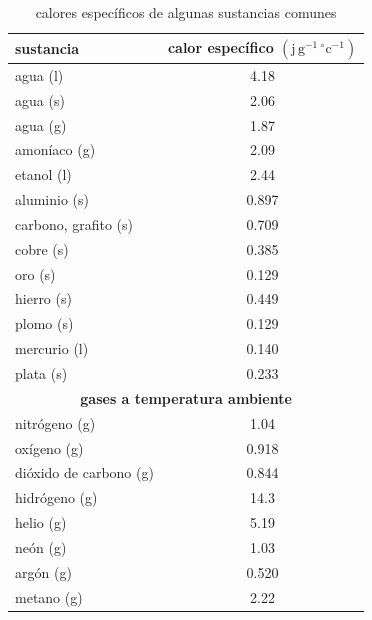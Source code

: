 \begin{table}[h!]
      \centering
      \caption{calores específicos de algunas sustancias comunes}
      \label{tab:calores_especificos}
      \begin{tabular}{l c}
          \hline
          \textbf{sustancia} & \textbf{calor específico} $\left(\mathrm{j\,g^{-1}\,^{\circ}c^{-1}}\right)$ \\
          \hline
          agua (l)                & 4.18  \\
          agua (s)                & 2.06  \\
          agua (g)                & 1.87  \\
          amoníaco (g)            & 2.09  \\
          etanol (l)              & 2.44  \\
          aluminio (s)            & 0.897 \\
          carbono, grafito (s)    & 0.709 \\
          cobre (s)               & 0.385 \\
          oro (s)                 & 0.129 \\
          hierro (s)              & 0.449 \\
          plomo (s)               & 0.129 \\
          mercurio (l)            & 0.140 \\
          plata (s)               & 0.233 \\
          \hline
          \multicolumn{2}{c}{\textbf{gases a temperatura ambiente}} \\
          \hline
          nitrógeno (g)           & 1.04  \\
          oxígeno (g)             & 0.918 \\
          dióxido de carbono (g)  & 0.844 \\
          hidrógeno (g)           & 14.3  \\
          helio (g)               & 5.19  \\
          neón (g)                & 1.03  \\
          argón (g)               & 0.520 \\
          metano (g)              & 2.22  \\
          \hline
      \end{tabular}
\end{table}
